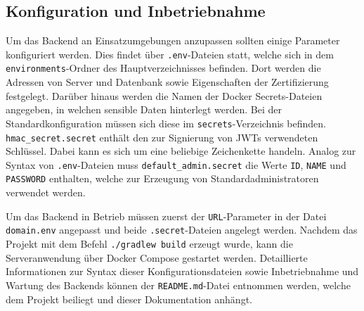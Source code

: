 \documentclass[a4paper, 11pt]{article}
\begin{document}
\subsection{Konfiguration und Inbetriebnahme}
\label{subsec:backend:configuration}
Um das Backend an Einsatzumgebungen anzupassen sollten einige Parameter konfiguriert werden.
Dies findet über \verb|.env|-Dateien statt, welche sich in dem \verb|environments|-Ordner des Hauptverzeichnisses befinden.
Dort werden die Adressen von Server und Datenbank sowie Eigenschaften der Zertifizierung festgelegt.
Darüber hinaus werden die Namen der Docker Secrets-Dateien angegeben, in welchen sensible Daten hinterlegt werden.
Bei der Standardkonfiguration müssen sich diese im \verb|secrets|-Verzeichnis befinden.
\verb|hmac_secret.secret| enthält den zur Signierung von JWTs verwendeten Schlüssel.
Dabei kann es sich um eine beliebige Zeichenkette handeln.
Analog zur Syntax von \verb|.env|-Dateien muss \verb|default_admin.secret| die Werte \verb|ID|, \verb|NAME| und \verb|PASSWORD| enthalten, welche zur Erzeugung von Standardadministratoren verwendet werden.

Um das Backend in Betrieb müssen zuerst der \verb|URL|-Parameter in der Datei \verb|domain.env| angepasst und beide \verb|.secret|-Dateien angelegt werden.
Nachdem das Projekt mit dem Befehl \verb|./gradlew build| erzeugt wurde, kann die Serveranwendung über Docker Compose gestartet werden.
Detaillierte Informationen zur Syntax dieser Konfigurationsdateien sowie Inbetriebnahme und Wartung des Backends können der \verb|README.md|-Datei entnommen werden, welche dem Projekt beiliegt und dieser Dokumentation anhängt.
\end{document}
